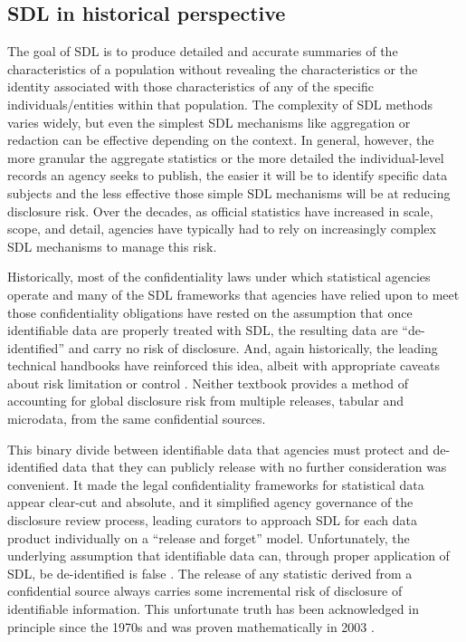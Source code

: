 \subsection{SDL in historical perspective}
The goal of SDL is to produce detailed and accurate summaries of the characteristics of a population without revealing the characteristics or the identity associated with those characteristics of any of the specific individuals/entities within that population. The complexity of SDL methods varies widely, but even the simplest SDL mechanisms like aggregation or redaction can be effective depending on the context. In general, however, the more granular the aggregate statistics or the more detailed the individual-level records an agency seeks to publish, the easier it will be to identify specific data subjects and the less effective those simple SDL mechanisms will be at reducing disclosure risk. Over the decades, as official statistics have increased in scale, scope, and detail, agencies have typically had to rely on increasingly complex SDL mechanisms to manage this risk.

Historically, most of the confidentiality laws under which statistical agencies operate and many of the SDL frameworks that agencies have relied upon to meet those confidentiality obligations have rested on the assumption that once identifiable data are properly treated with SDL, the resulting data are ``de-identified'' and carry no risk of disclosure. And, again historically, the leading technical handbooks have reinforced this idea, albeit with appropriate caveats about risk limitation \cite{Duncan:et:al:2011} or control \cite{Willenborg:deWaal:2000}. Neither textbook provides a method of accounting for global disclosure risk from multiple releases, tabular and microdata, from the same confidential sources. 

This binary divide between identifiable data that agencies must protect and de-identified data that they can publicly release with no further consideration was convenient. It made the legal confidentiality frameworks for statistical data appear clear-cut and absolute, and it simplified agency governance of the disclosure review process, leading curators to approach SDL for each data product individually on a ``release and forget'' model. Unfortunately, the underlying assumption that identifiable data can, through proper application of SDL, be de-identified is false \cite{garfinkel:et:al:2023}. The release of any statistic derived from a confidential source always carries some incremental risk of disclosure of identifiable information. This unfortunate truth has been acknowledged in principle since the 1970s \cite{FCSM:SWP2:1978} and was proven mathematically in 2003 \cite{dinur:nissim:2003:10.1145/773153.773173}.

